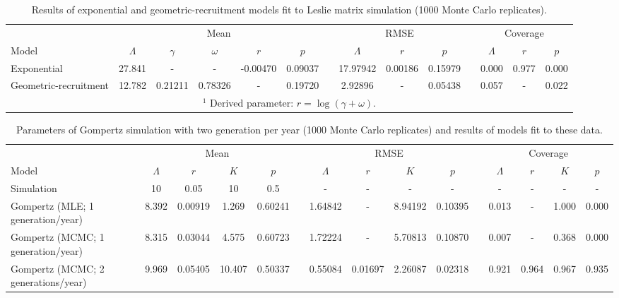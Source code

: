 \documentclass{article}
\begin{document}
\begin{landscape}
\clearpage

\begin{table}[htb]
  \centering
  \footnotesize
  \caption{Results of exponential and geometric-recruitment models fit to Leslie matrix simulation (1000 Monte Carlo replicates).}
  \begin{tabular}{lccccccccccccc}
    \hline
    & \multicolumn{5}{c}{Mean} &&
    \multicolumn{3}{c}{RMSE} &&
    \multicolumn{3}{c}{Coverage} \\
    \cline{2-6}     \cline{8-10}    \cline{12-14}
    Model & $\Lambda$ & $\gamma$ & $\omega$ & $r$\footnotemark[1] & $p$ &&
    $\Lambda$ & $r$ & $p$ && 
    $\Lambda$ & $r$ & $p$ \\
    \hline
Exponential &
27.841	&-	&- 	&-0.00470	&0.09037	&&
17.97942	&0.00186 	&0.15979	&&
0.000 		&0.977 	&0.000 \\
Geometric-recruitment &
12.782	&0.21211	&0.78326	&-	&0.19720	&&
2.92896 	&- 	&0.05438	&&
0.057		&- 	&0.022 \\
  \hline
  \multicolumn{14}{c}{$^{1}$ Derived parameter: $r = \log(\gamma + \omega)$.}
  \end{tabular}
  \label{tab:simmat}
\end{table}
\clearpage

\begin{table}[htb]
  \centering
  \footnotesize
  \caption{Parameters of Gompertz simulation with two generation per year 
(1000 Monte Carlo replicates)
  and results of models fit to these data.}
  \begin{tabular}{lcccccccccccccc}
    \hline
    & \multicolumn{4}{c}{Mean} &&
    \multicolumn{4}{c}{RMSE} &&
    \multicolumn{4}{c}{Coverage} \\
    \cline{2-5}     \cline{7-10}    \cline{12-15}
    Model & $\Lambda$ & $r$ & $K$ & $p$ &&
    $\Lambda$ & $r$ & $K$ & $p$ && 
    $\Lambda$ & $r$ & $K$ & $p$ \\
    \hline
Simulation & 
10	&0.05	&10	&0.5	&&-	&-	&-	&-	&&-	&-	&-	&-\\
Gompertz (MLE; 1 generation/year) &
8.392	&0.00919	&1.269	&0.60241	&&
1.64842	&-	&8.94192	&0.10395	&&
0.013	&-	&1.000 	&0.000 \\
Gompertz (MCMC; 1 generation/year) &
8.315	&0.03044	&4.575	&0.60723	&&
1.72224	&-	&5.70813	&0.10870	&&
0.007	&-	&0.368		&0.000 \\
Gompertz (MCMC; 2 generations/year) &
9.969	&0.05405	&10.407	&0.50337	&&
0.55084	&0.01697	&2.26087	&0.02318	&&
0.921	&0.964	&0.967	&0.935 \\
  \hline
  \end{tabular}
  \label{tab:simgomp}
\end{table}


\end{landscape}
\end{document}
